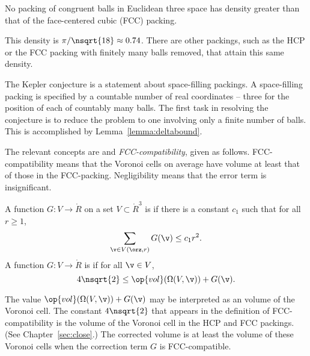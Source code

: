 \begin{theorem*} 
\label{theorem:kepler}   
%
No packing of congruent balls in Euclidean three space has density
greater than that of the face-centered cubic (FCC) packing.
\end{theorem*}
%
%
%
%
%

\begin{remark}
This density is $\pi/\nsqrt{18}\approx 0.74$.  There are other
packings, such as the HCP or the FCC
packing with finitely many balls removed, that attain this
same density.
\end{remark}

The Kepler conjecture is a statement about space-filling packings.  A
space-filling packing is specified by a countable number of real
coordinates -- three for the position of each of countably many balls.
The first task in resolving the conjecture is to reduce the problem to
one involving only a finite number of balls.  This is accomplished by
Lemma~\ref{lemma:deltabound}.

The relevant concepts are  and {\it
  FCC-compatibility}, given as follows.  FCC-compatibility means that
the Voronoi cells on average have volume at least that of those in the
FCC-packing.  Negligibility means that the error term is insignificant.


\begin{definition}\label{def:negligible}
A function $G:V\to \ring{R}$ on a set $V\subset\ring{R}^3$
is 
if there is a constant $c_1$ such that for all $r\ge1$,
\[ \sum_{\v\in V(\orz,r)} G(\v) \le c_1
r^2.\] 
A function $G: V\to\ring{R}$ is
if for all $\v\in V$, 
\[ 4\nsqrt{2}\le \op{vol}(\Omega(V,\v)) +
G(\v).\] 
%
\end{definition}


\begin{remark}
  The value $\op{vol}(\Omega(V,\v)) + G(\v)$ may be interpreted as an
   volume of the Voronoi cell. The constant
  $4\nsqrt{2}$ that appears in the definition of FCC-compatibility is
  the volume of the Voronoi cell in the HCP and FCC packings.  (See
  Chapter~\ref{sec:close}.)  The corrected volume is at least the
  volume of these Voronoi cells when the correction term $G$ is
  FCC-compatible.
%
%
\end{remark}


